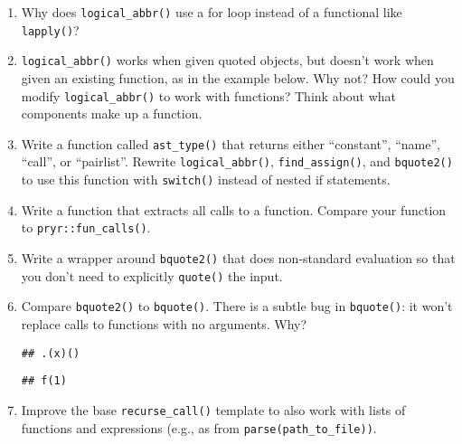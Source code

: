 \begin{enumerate}
\def\labelenumi{\arabic{enumi}.}
\item
  Why does \texttt{logical\_abbr()} use a for loop instead of a
  functional like \texttt{lapply()}?
\item
  \texttt{logical\_abbr()} works when given quoted objects, but doesn't
  work when given an existing function, as in the example below. Why
  not? How could you modify \texttt{logical\_abbr()} to work with
  functions? Think about what components make up a function.

\begin{Shaded}
\begin{Highlighting}[]
\StringTok{ }\NormalTok{(} \NormalTok{) \{}
  \OperatorTok{+}\StringTok{ }
\NormalTok{\}}
\end{Highlighting}
\end{Shaded}
\item
  Write a function called \texttt{ast\_type()} that returns either
  ``constant'', ``name'', ``call'', or ``pairlist''. Rewrite
  \texttt{logical\_abbr()}, \texttt{find\_assign()}, and
  \texttt{bquote2()} to use this function with \texttt{switch()} instead
  of nested if statements.
\item
  Write a function that extracts all calls to a function. Compare your
  function to \texttt{pryr::fun\_calls()}.
\item
  Write a wrapper around \texttt{bquote2()} that does non-standard
  evaluation so that you don't need to explicitly \texttt{quote()} the
  input.
\item
  Compare \texttt{bquote2()} to \texttt{bquote()}. There is a subtle bug
  in \texttt{bquote()}: it won't replace calls to functions with no
  arguments. Why?

\begin{Shaded}
\begin{Highlighting}[]
\NormalTok{(} 
\end{Highlighting}
\end{Shaded}

\begin{verbatim}
## .(x)()
\end{verbatim}

\begin{Shaded}
\begin{Highlighting}[]
\NormalTok{), }\NormalTok{(} 
\end{Highlighting}
\end{Shaded}

\begin{verbatim}
## f(1)
\end{verbatim}
\item
  Improve the base \texttt{recurse\_call()} template to also work with
  lists of functions and expressions (e.g., as from
  \texttt{parse(path\_to\_file))}.
\end{enumerate}
